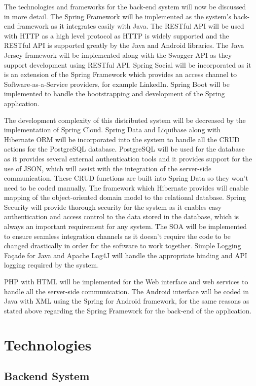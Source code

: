 \documentclass[a4paper,10pt]{article}
\begin{document}
		The technologies and frameworks for the back-end system will now be discussed in more detail. The Spring Framework will be implemented as the system’s back-end framework as it integrates easily with Java. The RESTful API will be used with HTTP as a high level protocol as HTTP is widely supported and the RESTful API is supported greatly by the Java and Android libraries. The Java Jersey framework will be implemented along with the Swagger API as they support development using RESTful API. Spring Social will be incorporated as it is an extension of the Spring Framework which provides an access channel to Software-as-a-Service providers, for example LinkedIn. Spring Boot will be implemented to handle the bootstrapping and development of the Spring application.
		
		The development complexity of this distributed system will be decreased by the implementation of Spring Cloud. Spring Data and Liquibase along with Hibernate ORM will be incorporated into the system to handle all the CRUD actions for the PostgreSQL database. PostgreSQL will be used for the database as it provides several external authentication tools and it provides support for the use of JSON, which will assist with the integration of the server-side communication. These CRUD functions are built into Spring Data so they won’t need to be coded manually. The framework which Hibernate provides will enable mapping of the object-oriented domain model to the relational database. Spring Security will provide thorough security for the system as it enables easy authentication and access control to the data stored in the database, which is always an important requirement for any system. The SOA will be implemented to ensure seamless integration channels as it doesn’t require the code to be changed drastically in order for the software to work together. Simple Logging Façade for Java and Apache Log4J will handle the appropriate binding and API logging required by the system.
		
		PHP with HTML will be implemented for the Web interface and web services to handle all the server-side communication. The Android interface will be coded in Java with XML using the Spring for Android framework, for the same reasons as stated above regarding the Spring Framework for the back-end of the application.

\section{Technologies}
\subsection{Backend System}
\end{document}
